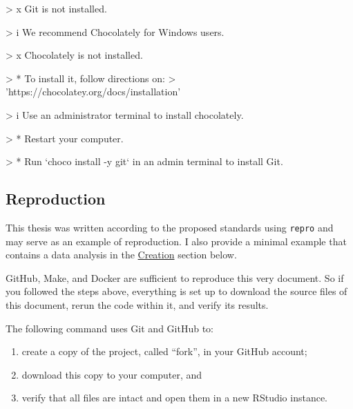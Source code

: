 \documentclass[12pt,a4paper,twoside]{article}
\providecommand{\tightlist}{%
  \setlength{\itemsep}{0pt}\setlength{\parskip}{0pt}}
\let\oldverbatim\verbatim
\let\endoldverbatim\endverbatim
\renewenvironment{verbatim}{\footnotesize\oldverbatim}{\endoldverbatim}
\begin{document}
\begin{verbatim}
> x Git is not installed.
\end{verbatim}

\begin{verbatim}
> i We recommend Chocolately for Windows users.
\end{verbatim}

\begin{verbatim}
> x Chocolately is not installed.
\end{verbatim}

\begin{verbatim}
> * To install it, follow directions on:
>   'https://chocolatey.org/docs/installation'
\end{verbatim}

\begin{verbatim}
> i Use an administrator terminal to install chocolately.
\end{verbatim}

\begin{verbatim}
> * Restart your computer.
\end{verbatim}

\begin{verbatim}
> * Run `choco install -y git` in an admin terminal to install Git.
\end{verbatim}

\hypertarget{reproduction}{%
\subsection{Reproduction}\label{reproduction}}

This thesis was written according to the proposed standards using \texttt{repro} and may serve as an example of reproduction.
I also provide a minimal example that contains a data analysis in the \protect\hyperlink{creation}{Creation} section below.

GitHub, Make, and Docker are sufficient to reproduce this very document.
So if you followed the steps above, everything is set up to download the source files of this document, rerun the code within it, and verify its results.

The following command uses Git and GitHub to:

\begin{enumerate}
\def\labelenumi{\arabic{enumi}.}
\tightlist
\item
  create a copy of the project, called ``fork'', in your GitHub account;
\item
  download this copy to your computer, and
\item
  verify that all files are intact and open them in a new RStudio instance.
\end{enumerate}
\end{document}
